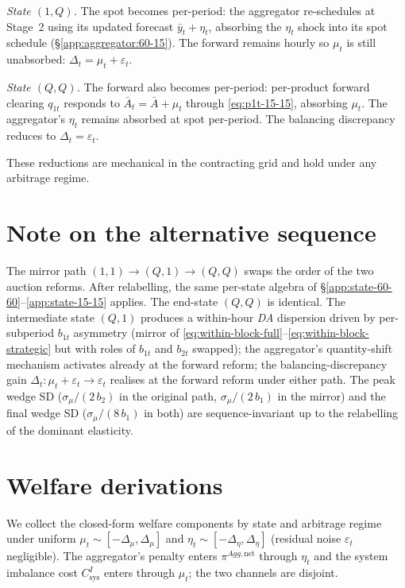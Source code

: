 \documentclass[11pt]{article}
\begin{document}
\emph{State $(1,Q)$.} The spot becomes per-period: the aggregator re-schedules at Stage~2 using its updated forecast $\bar y_t + \eta_t$, absorbing the $\eta_t$ shock into its spot schedule (\S\ref{app:aggregator:60-15}). The forward remains hourly so $\mu_t$ is still unabsorbed: $\Delta_t = \mu_t + \varepsilon_t$.

\emph{State $(Q,Q)$.} The forward also becomes per-period: per-product forward clearing $q_{1t}$ responds to $\bar A_t = \bar A + \mu_t$ through \eqref{eq:p1t-15-15}, absorbing $\mu_t$. The aggregator's $\eta_t$ remains absorbed at spot per-period. The balancing discrepancy reduces to $\Delta_t = \varepsilon_t$.

These reductions are mechanical in the contracting grid and hold under any arbitrage regime.

\section{Note on the alternative sequence}\label{app:alt-sequence}

The mirror path $(1,1) \to (Q,1) \to (Q,Q)$ swaps the order of the two auction reforms. After relabelling, the same per-state algebra of \S\ref{app:state-60-60}--\ref{app:state-15-15} applies. The end-state $(Q,Q)$ is identical. The intermediate state $(Q,1)$ produces a within-hour \emph{DA} dispersion driven by per-subperiod $b_{1t}$ asymmetry (mirror of \eqref{eq:within-block-full}--\eqref{eq:within-block-strategic} but with roles of $b_{1t}$ and $b_{2t}$ swapped); the aggregator's quantity-shift mechanism activates already at the forward reform; the balancing-discrepancy gain $\Delta_t : \mu_t + \varepsilon_t \to \varepsilon_t$ realises at the forward reform under either path. The peak wedge SD ($\sigma_\mu / (2\, b_2)$ in the original path, $\sigma_\mu/(2\, b_1)$ in the mirror) and the final wedge SD ($\sigma_\mu/(8\, b_1)$ in both) are sequence-invariant up to the relabelling of the dominant elasticity.

\section{Welfare derivations}\label{app:welfare}

We collect the closed-form welfare components by state and arbitrage regime under uniform $\mu_t \sim [-\Delta_\mu, \Delta_\mu]$ and $\eta_t \sim [-\Delta_\eta, \Delta_\eta]$ (residual noise $\varepsilon_t$ negligible). The aggregator's penalty enters $\pi^{Agg,\text{net}}$ through $\eta_t$ and the system imbalance cost $C^I_{\text{sys}}$ enters through $\mu_t$; the two channels are disjoint.
\end{document}

